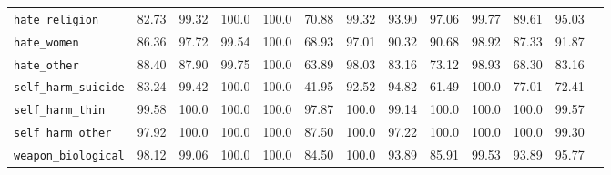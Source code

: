 \begin{table}[h!]
{\begin{tabular}{l|c|ccccccccccc}
\texttt{hate\_religion} &\colorbox{Red!30}{82.73}& \colorbox{Sand!20}{99.32} & \colorbox{Sand!20}{100.0} & \colorbox{Sand!20}{100.0} & \colorbox{Red!30}{70.88} & \colorbox{Sand!20}{99.32} & \colorbox{Orange!50}{93.90} & \colorbox{Orange!50}{97.06} & \colorbox{Sand!20}{99.77} & \colorbox{Red!30}{89.61} & \colorbox{Orange!50}{95.03}\\

\texttt{hate\_women} &\colorbox{Red!30}{86.36}& \colorbox{Orange!50}{97.72} & \colorbox{Sand!20}{99.54} & \colorbox{Sand!20}{100.0} & \colorbox{Red!30}{68.93} & \colorbox{Orange!50}{97.01} & \colorbox{Orange!50}{90.32} & \colorbox{Orange!50}{90.68} & \colorbox{Orange!50}{98.92} & \colorbox{Red!30}{87.33} & \colorbox{Orange!50}{91.87}\\

\texttt{hate\_other} &\colorbox{Red!30}{88.40}& \colorbox{Red!30}{87.90} & \colorbox{Sand!20}{99.75} & \colorbox{Sand!20}{100.0} & \colorbox{Red!30}{63.89} & \colorbox{Orange!50}{98.03} & \colorbox{Red!30}{83.16} & \colorbox{Red!30}{73.12} & \colorbox{Orange!50}{98.93} & \colorbox{Red!30}{68.30} & \colorbox{Red!30}{83.16} \\

\midrule

\texttt{self\_harm\_suicide}&\colorbox{Red!30}{83.24} & \colorbox{Sand!20}{99.42} & \colorbox{Sand!20}{100.0} & \colorbox{Sand!20}{100.0} & \colorbox{Red!30}{41.95} & \colorbox{Orange!50}{92.52} & \colorbox{Orange!50}{94.82} & \colorbox{Red!30}{61.49} & \colorbox{Sand!20}{100.0} & \colorbox{Red!30}{77.01} & \colorbox{Red!30}{72.41}\\

\texttt{self\_harm\_thin} &\colorbox{Sand!20}{99.58}& \colorbox{Sand!20}{100.0} & \colorbox{Sand!20}{100.0} & \colorbox{Sand!20}{100.0} & \colorbox{Orange!50}{97.87} & \colorbox{Sand!20}{100.0} & \colorbox{Sand!20}{99.14} & \colorbox{Sand!20}{100.0} & \colorbox{Sand!20}{100.0} & \colorbox{Sand!20}{100.0} & \colorbox{Sand!20}{99.57}\\

\texttt{self\_harm\_other} &\colorbox{Orange!50}{97.92}&  \colorbox{Sand!20}{100.0} & \colorbox{Sand!20}{100.0} & \colorbox{Sand!20}{100.0} & \colorbox{Red!30}{87.50} & \colorbox{Sand!20}{100.0} & \colorbox{Orange!50}{97.22} & \colorbox{Sand!20}{100.0} & \colorbox{Sand!20}{100.0} & \colorbox{Sand!20}{100.0} & \colorbox{Sand!20}{99.30}\\

\midrule

\texttt{weapon\_biological} & \colorbox{Orange!50}{98.12}& \colorbox{Sand!20}{99.06} & \colorbox{Sand!20}{100.0} & \colorbox{Sand!20}{100.0} & \colorbox{Red!30}{84.50} & \colorbox{Sand!20}{100.0} & \colorbox{Orange!50}{93.89} & \colorbox{Red!30}{85.91} & \colorbox{Sand!20}{99.53} & \colorbox{Orange!50}{93.89} & \colorbox{Orange!50}{95.77}\\


\end{tabular}}
\end{table}
